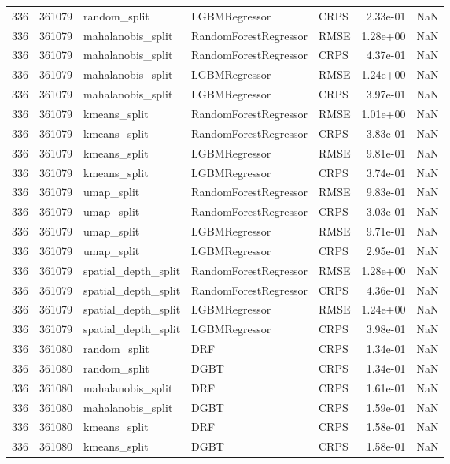 \begin{tabular}{rrlllrr}
336 & 361079 & random\_split & LGBMRegressor & CRPS & 2.33e-01 & NaN \\
336 & 361079 & mahalanobis\_split & RandomForestRegressor & RMSE & 1.28e+00 & NaN \\
336 & 361079 & mahalanobis\_split & RandomForestRegressor & CRPS & 4.37e-01 & NaN \\
336 & 361079 & mahalanobis\_split & LGBMRegressor & RMSE & 1.24e+00 & NaN \\
336 & 361079 & mahalanobis\_split & LGBMRegressor & CRPS & 3.97e-01 & NaN \\
336 & 361079 & kmeans\_split & RandomForestRegressor & RMSE & 1.01e+00 & NaN \\
336 & 361079 & kmeans\_split & RandomForestRegressor & CRPS & 3.83e-01 & NaN \\
336 & 361079 & kmeans\_split & LGBMRegressor & RMSE & 9.81e-01 & NaN \\
336 & 361079 & kmeans\_split & LGBMRegressor & CRPS & 3.74e-01 & NaN \\
336 & 361079 & umap\_split & RandomForestRegressor & RMSE & 9.83e-01 & NaN \\
336 & 361079 & umap\_split & RandomForestRegressor & CRPS & 3.03e-01 & NaN \\
336 & 361079 & umap\_split & LGBMRegressor & RMSE & 9.71e-01 & NaN \\
336 & 361079 & umap\_split & LGBMRegressor & CRPS & 2.95e-01 & NaN \\
336 & 361079 & spatial\_depth\_split & RandomForestRegressor & RMSE & 1.28e+00 & NaN \\
336 & 361079 & spatial\_depth\_split & RandomForestRegressor & CRPS & 4.36e-01 & NaN \\
336 & 361079 & spatial\_depth\_split & LGBMRegressor & RMSE & 1.24e+00 & NaN \\
336 & 361079 & spatial\_depth\_split & LGBMRegressor & CRPS & 3.98e-01 & NaN \\
336 & 361080 & random\_split & DRF & CRPS & 1.34e-01 & NaN \\
336 & 361080 & random\_split & DGBT & CRPS & 1.34e-01 & NaN \\
336 & 361080 & mahalanobis\_split & DRF & CRPS & 1.61e-01 & NaN \\
336 & 361080 & mahalanobis\_split & DGBT & CRPS & 1.59e-01 & NaN \\
336 & 361080 & kmeans\_split & DRF & CRPS & 1.58e-01 & NaN \\
336 & 361080 & kmeans\_split & DGBT & CRPS & 1.58e-01 & NaN \\

\end{tabular}

